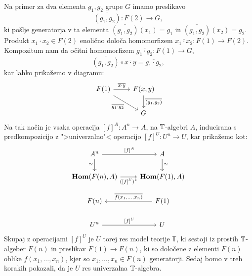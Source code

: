 \documentclass[../kategoricna_logika.tex]{subfiles}
\begin{document}
\begin{dokaz}
  Na primer za dva elementa $g_1, g_2$ grupe $G$ imamo preslikavo
  \[\overline{(g_1, g_2)} : F(2) \to G, \]
  ki pošlje generatorja v ta elementa
  $\overline{(g_1, g_2)}(x_1) = g_1$ in $\overline{(g_1,g_2)}(x_2) = g_2$.
  Produkt ${x_1 \cdot x_2 \in F(2)}$ enolično določa homomorfizem
  $\overline{x_1 \cdot x_2}: F(1) \to F(2)$. Kompozitum nam da očitni homomorfizem
  $\overline{g_1 \cdot g_2} : F(1) \to G$,
  \[ \overline{(g_1, g_2)} \circ \overline{x \cdot y} = \overline{g_1 \cdot g_2}, \]
  kar lahko prikažemo v diagramu:
  \begin{equation*}
    \begin{tikzcd}
      F(1) \ar[dr, "{\overline{g_1 \cdot g_2}}"'] \ar[r, "{\overline{x \cdot y}}"] &
      F(x,y) \ar[d, "\overline{(g_1,g_2)}"] \\
      & G      
    \end{tikzcd}
  \end{equation*}
  Na tak način je vsaka operacija $[f]^A : A^n \to A$, na $\mathbb{T}$-algebri $A$, inducirana s
  predkompozicijo z ">univerzalno"< operacijo $[f]^U : U^n \to U$, kar prikažemo kot:
  \begin{equation}\label{diag:univerzalna-operacija}
    \begin{tikzcd}
      A^n \ar[d, "\cong"'] \ar[r, "{[f]^{A}}"] & A \ar[d, "\cong"] \\
      \Hom(F(n), A) \ar[r, "{([f]^U)^{*}}"'] & \Hom(F(1), A) \\
      F(n) & F(1) \ar[l, "{\overline{f(x_1, \ldots, x_n)}}"'] \\
      U^n \ar[r, "{[f]^U}"] & U
    \end{tikzcd}
  \end{equation}
  Skupaj z operacijami $[f]^U$ je $U$ torej res model teorije $\mathbb{T}$, ki
  sestoji iz prostih $\mathbb{T}$-algeber $F(n)$ in
  preslikav $F(1) \to F(n)$, ki so določene z elementi $F(n)$ oblike $f(x_1, \ldots, x_n)$,
  kjer so $x_1, \ldots , x_n \in F(n)$ generatorji. Sedaj bomo v treh korakih pokazali,
  da je $U$ res univerzalna $\mathbb{T}$-algebra.


\end{dokaz}
\end{document}
